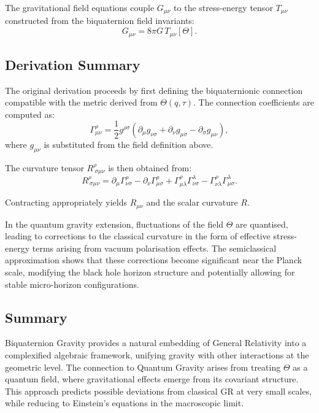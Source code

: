The gravitational field equations couple $G_{\mu\nu}$ to the stress-energy tensor
$T_{\mu\nu}$ constructed from the biquaternion field invariants:
\begin{equation}
  G_{\mu\nu} = 8\pi G \, T_{\mu\nu}[\Theta] .
\end{equation}

\subsection{Derivation Summary}

The original derivation proceeds by first defining the biquaternionic connection
compatible with the metric derived from $\Theta(q,\tau)$. The connection coefficients
are computed as:
\begin{equation}
  \Gamma^\rho_{\mu\nu} =
  \frac{1}{2} g^{\rho\sigma} \left( \partial_\mu g_{\nu\sigma}
  + \partial_\nu g_{\mu\sigma}
  - \partial_\sigma g_{\mu\nu} \right),
\end{equation}
where $g_{\mu\nu}$ is substituted from the field definition above.

The curvature tensor $R^\rho_{\ \sigma\mu\nu}$ is then obtained from:
\begin{equation}
  R^\rho_{\ \sigma\mu\nu} =
  \partial_\mu \Gamma^\rho_{\nu\sigma} -
  \partial_\nu \Gamma^\rho_{\mu\sigma} +
  \Gamma^\rho_{\mu\lambda} \Gamma^\lambda_{\nu\sigma} -
  \Gamma^\rho_{\nu\lambda} \Gamma^\lambda_{\mu\sigma} .
\end{equation}

Contracting appropriately yields $R_{\mu\nu}$ and the scalar curvature $R$.

In the quantum gravity extension, fluctuations of the field $\Theta$ are quantised,
leading to corrections to the classical curvature in the form of effective stress-energy
terms arising from vacuum polarisation effects. The semiclassical approximation shows that
these corrections become significant near the Planck scale, modifying the black hole
horizon structure and potentially allowing for stable micro-horizon configurations.

\subsection{Summary}

Biquaternion Gravity provides a natural embedding of General Relativity into a
complexified algebraic framework, unifying gravity with other interactions at the
geometric level. The connection to Quantum Gravity arises from treating $\Theta$ as a
quantum field, where gravitational effects emerge from its covariant structure. This
approach predicts possible deviations from classical GR at very small scales, while
reducing to Einstein's equations in the macroscopic limit.
